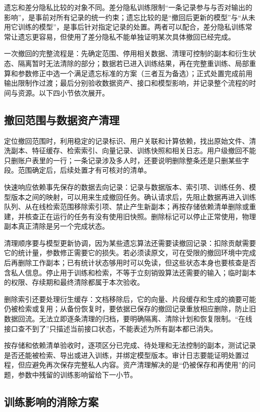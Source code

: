 遗忘和差分隐私比较的对象不同。差分隐私训练限制“一条记录参与与否对输出的影响”，是事前对所有记录的统一约束；遗忘比较的是“撤回后更新的模型”与“从未用它训练的模型”，是事后针对指定记录的处置。两者可以配合，差分隐私训练常常让遗忘更容易，但使用了差分隐私不能单独证明某次具体撤回已经完成。

一次撤回的完整流程是：先确定范围、停用相关数据、清理可控制的副本和衍生状态、隔离暂时无法清除的部分；数据若已进入训练结果，再在完整重训练、局部重算和参数修正中选一个满足遗忘标准的方案（三者互为备选）；正式处置完成前用输出限制作过渡；最后分别验收数据资产、接口和模型影响，并记录整个流程的时间与资源。以下四小节依次展开。

\subsection{撤回范围与数据资产清理}
\label{sec:privacy-asset-deletion}

定位撤回范围时，利用稳定的记录标识、用户关联和计算依赖，找出原始文件、清洗副本、特征缓存、检索索引、向量记录、训练快照和相关日志。用户级撤回不能只删账户表里的一行；一条记录涉及多人时，还要说明删除整条还是只删某些字段。范围确定后，后续处置才有可核对的清单。

快速响应依赖事先保存的数据去向记录：记录与数据版本、索引项、训练任务、模型版本之间的映射，可以用来生成撤回任务。确认请求后，先阻止数据再进入训练队列、从在线检索范围移除索引项、禁止产生新副本；再按存储依赖清单删除或重建，并核查正在运行的任务有没有使用旧快照。删除标记可以停止正常使用，物理副本真正清除是另一个完成状态。

清理顺序要与模型更新协调，因为某些遗忘算法还需要读撤回记录：扣除贡献需要它的统计量，参数修正需要它的损失。若必须读原文，可在受限的撤回环境中完成后再删除工作副本；已有统计状态够用时可以免读，但这些状态本身也要核查是否含私人信息。停止用于训练和检索，不等于立刻销毁算法还需要的输入；临时副本的权限、存续期和最终清除都属于本次验收。

删除索引还要处理衍生缓存：文档移除后，它的向量、片段缓存和生成的摘要可能仍被检索或复用；从备份恢复时，要依据已保存的撤回记录重放相应删除，防止旧数据回流。无法立即逐条清理的归档，要明确隔离、清除计划和恢复限制。“在线接口查不到了”只描述当前接口状态，不能表述为所有副本都已消失。

按存储和依赖清单验收时，逐项区分已完成、待处理和无法控制的副本，测试记录是否还能被检索、导出或进入训练，并绑定模型版本。审计日志要能证明处置过程，但应避免再次保存完整私人内容。资产清理解决的是“仍被保存和再使用”的问题，参数中残留的训练影响留给下一小节。

\subsection{训练影响的消除方案}
\label{sec:privacy-unlearning-methods}

